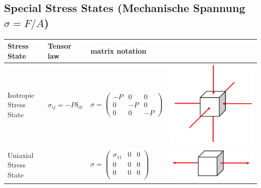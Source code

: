 \subsection{Special Stress States (Mechanische Spannung $\sigma = F/A$)}
	\begin{tabularx}{\columnwidth}{p{2cm}p{2cm}XX}
		\hline 
		Stress State & Tensor law & matrix notation & \\ 
		\hline 
		Isotropic Stress State & $\sigma_{ij} = -P\delta_{ik}$&	$ \sigma = \begin{pmatrix} -P & 0 & 0\\ 0 & -P & 0\\ 0 & 0 & -P \end{pmatrix}$ &\vspace*{-1.2cm}\includegraphics[scale=.11]{images/3Dcfisotropic}\\
		\hline 
		Uniaxial Stress State & & 		$ \sigma = \begin{pmatrix} \sigma_{11} & 0 & 0\\ 0 & 0 & 0\\ 0 & 0 & 0\\ \end{pmatrix}$ &		\vspace*{-1.2cm}\includegraphics[scale=.12]{images/3Dcfuniaxial}\\

\end{tabularx}
